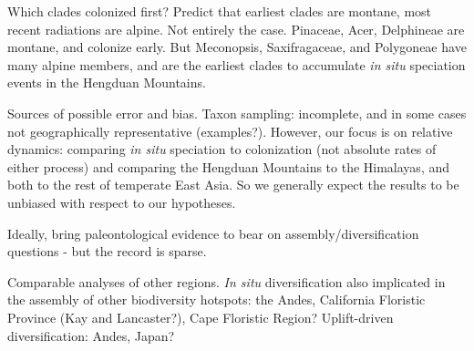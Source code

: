 Which clades colonized first? Predict that earliest clades are montane, most recent radiations are alpine. Not entirely the case. Pinaceae, Acer, Delphineae are montane, and colonize early. But Meconopsis, Saxifragaceae, and Polygoneae have many alpine members, and are the earliest clades to accumulate \textit{in situ} speciation events in the Hengduan Mountains.

Sources of possible error and bias. Taxon sampling: incomplete, and in some cases not geographically representative (examples?). However, our focus is on relative dynamics: comparing \textit{in situ} speciation to colonization (not absolute rates of either process) and comparing the Hengduan Mountains to the Himalayas, and both to the rest of temperate East Asia. So we generally expect the results to be unbiased with respect to our hypotheses.

Ideally, bring paleontological evidence to bear on assembly/diversification questions - but the record is sparse.

Comparable analyses of other regions. \textit{In situ} diversification also implicated in the assembly of other biodiversity hotspots: the Andes, California Floristic Province (Kay and Lancaster?), Cape Floristic Region? Uplift-driven diversification: Andes, Japan?
